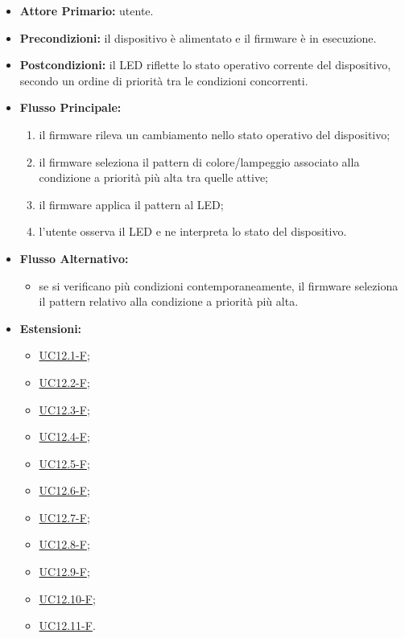 \begin{itemize}
    \item \textbf{Attore Primario:} utente.

    \item \textbf{Precondizioni:} il dispositivo è alimentato e il firmware è in esecuzione.

    \item \textbf{Postcondizioni:} il LED riflette lo stato operativo corrente del dispositivo,
    secondo un ordine di priorità tra le condizioni concorrenti.

    \item \textbf{Flusso Principale:}
    \begin{enumerate}
        \item il firmware rileva un cambiamento nello stato operativo del dispositivo;
        \item il firmware seleziona il pattern di colore/lampeggio associato alla condizione a
        priorità più alta tra quelle attive;
        \item il firmware applica il pattern al LED;
        \item l'utente osserva il LED e ne interpreta lo stato del dispositivo.
    \end{enumerate}

    \item \textbf{Flusso Alternativo:}
    \begin{itemize}
        \item se si verificano più condizioni contemporaneamente, il firmware seleziona il pattern
        relativo alla condizione a priorità più alta.
    \end{itemize}

    \item \textbf{Estensioni:}
    \begin{itemize}
        \item \hyperref[uc:uc_led_sd_mancante]{UC12.1-F};
        \item \hyperref[uc:uc_led_errore]{UC12.2-F};
        \item \hyperref[uc:uc_led_pairing_wifi]{UC12.3-F};
        \item \hyperref[uc:uc_led_pairing_ble]{UC12.4-F};
        \item \hyperref[uc:uc_led_recupero_calibrazione]{UC12.5-F};
        \item \hyperref[uc:uc_led_calibrazione]{UC12.6-F};
        \item \hyperref[uc:uc_led_download]{UC12.7-F};
        \item \hyperref[uc:uc_led_eliminazione]{UC12.8-F};
        \item \hyperref[uc:uc_led_sospensione]{UC12.9-F};
        \item \hyperref[uc:uc_led_logging]{UC12.10-F};
        \item \hyperref[uc:uc_led_standby]{UC12.11-F}.
    \end{itemize}
\end{itemize}

